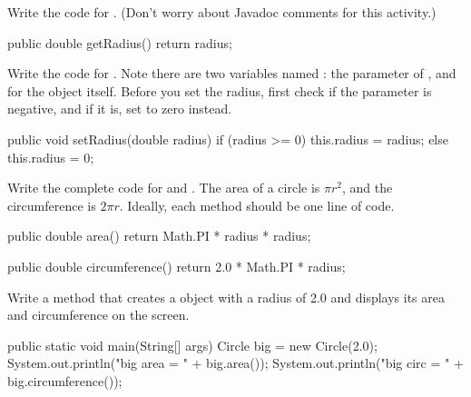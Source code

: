 \Q Write the code for . (Don't worry about Javadoc comments for this activity.)

\begin{answer}[6em]
\begin{javaans}
    public double getRadius() {
        return radius;
    }
\end{javaans}
\end{answer}


\Q Write the code for . Note there are two variables named : the parameter of , and  for the object itself. Before you set the radius, first check if the parameter is negative, and if it is, set  to zero instead.

\begin{answer}[12em]
\begin{javaans}
    public void setRadius(double radius) {
        if (radius >= 0) {
            this.radius = radius;
        }
        else {
            this.radius = 0;
        }
    }
\end{javaans}
\end{answer}


\Q Write the complete code for  and .
The area of a circle is $\pi r^2$, and the circumference is $2 \pi r$.
Ideally, each method should be one line of code.

\begin{answer}[12em]
\begin{javaans}
    public double area() {
        return Math.PI * radius * radius;
    }

    public double circumference() {
        return 2.0 * Math.PI * radius;
    }
\end{javaans}
\end{answer}


\Q Write a  method that creates a  object with a radius of 2.0 and displays its area and circumference on the screen.

\begin{answer}[8em]
\begin{javaans}
    public static void main(String[] args) {
        Circle big = new Circle(2.0);
        System.out.println("big area = " + big.area());
        System.out.println("big circ = " + big.circumference());
    }
\end{javaans}
\end{answer}

